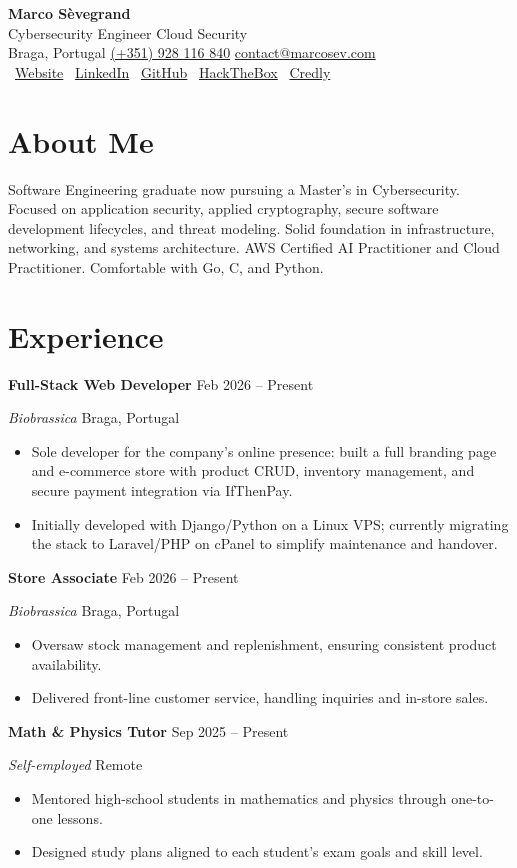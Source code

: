 \documentclass[11pt,a4paper]{article}
\makeatletter
\newcommand{\cvheader}[1]{%
  \begin{center}
    {\Huge\bfseries\color{heading} Marco Sèvegrand}\\[0.15em]
    {\large\color{muted} Cybersecurity Engineer \textbar{} Cloud Security}\\[0.25em]
    {\small\color{muted}
      Braga, Portugal \textbar{}
      \href{tel:+351928116840}{(+351) 928 116 840} \textbar{}
      \href{mailto:contact@marcosev.com}{contact@marcosev.com}
    }\\[0.05em]
    {\small\color{muted}
      \faGlobe\ \href{https://marcosev.com}{Website}
      \hspace{0.5em}
      \faLinkedin\ \href{https://linkedin.com/in/marcosevegrand}{LinkedIn}
      \hspace{0.5em}
      \faGithub\ \href{https://github.com/marcosevegrand}{GitHub}
      \hspace{0.5em}
      \faUserSecret\ \href{https://profile.hackthebox.com/profile/019ed207-d16a-73ea-b364-93cb385a2cf5}{HackTheBox}
      \hspace{0.5em}
      \faAward\ \href{https://www.credly.com/users/marcosevegrand}{Credly}
    }
  \end{center}
  \vspace{-0.3em}
}
\newenvironment{cvitem}[2]{%
  \vspace{0.25em}
  \noindent
  \textbf{\color{heading}#1}%
  \hfill
  {\small\color{muted}#2}%
  \par
}{}
\newcommand{\cvsub}[2]{%
  \noindent
  {\itshape\color{text}#1}%
  \hfill
  {\small\color{muted}#2}%
  \par
}
\newenvironment{cvbullets}{%
  \begin{itemize}[leftmargin=1.2em, itemsep=0em, topsep=0em, parsep=0em]
}{%
  \end{itemize}
}
\makeatother
\begin{document}
\cvheader{}

\section{About Me}
Software Engineering graduate now pursuing a Master's in Cybersecurity.
Focused on application security, applied cryptography, secure software
development lifecycles, and threat modeling. Solid foundation in
infrastructure, networking, and systems architecture. AWS Certified AI
Practitioner and Cloud Practitioner. Comfortable with Go, C, and Python.

\section{Experience}

\begin{cvitem}{Full-Stack Web Developer}{Feb 2026 -- Present}
\cvsub{Biobrassica}{Braga, Portugal}
\begin{cvbullets}
  \item Sole developer for the company's online presence: built a full
    branding page and e-commerce store with product CRUD, inventory
    management, and secure payment integration via IfThenPay.
  \item Initially developed with Django/Python on a Linux VPS; currently
    migrating the stack to Laravel/PHP on cPanel to simplify maintenance
    and handover.
\end{cvbullets}
\end{cvitem}

\begin{cvitem}{Store Associate}{Feb 2026 -- Present}
\cvsub{Biobrassica}{Braga, Portugal}
\begin{cvbullets}
  \item Oversaw stock management and replenishment, ensuring consistent
    product availability.
  \item Delivered front-line customer service, handling inquiries and
    in-store sales.
\end{cvbullets}
\end{cvitem}

\begin{cvitem}{Math \& Physics Tutor}{Sep 2025 -- Present}
\cvsub{Self-employed}{Remote}
\begin{cvbullets}
  \item Mentored high-school students in mathematics and physics through
    one-to-one lessons.
  \item Designed study plans aligned to each student's exam goals and
    skill level.
\end{cvbullets}
\end{cvitem}
\end{document}
